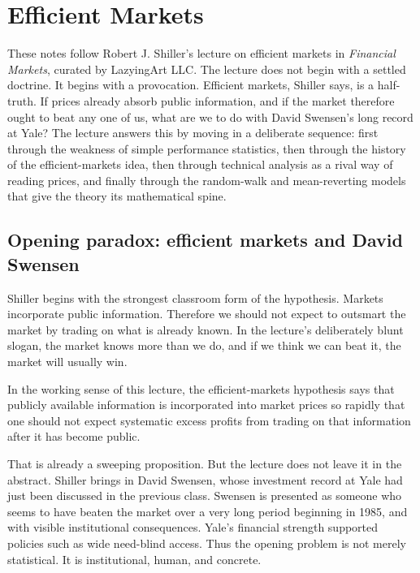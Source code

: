 \chapter{Efficient Markets}

These notes follow Robert J. Shiller's lecture on efficient markets in \emph{Financial Markets}, curated by LazyingArt LLC. The lecture does not begin with a settled doctrine. It begins with a provocation. Efficient markets, Shiller says, is a half-truth. If prices already absorb public information, and if the market therefore ought to beat any one of us, what are we to do with David Swensen's long record at Yale? The lecture answers this by moving in a deliberate sequence: first through the weakness of simple performance statistics, then through the history of the efficient-markets idea, then through technical analysis as a rival way of reading prices, and finally through the random-walk and mean-reverting models that give the theory its mathematical spine.

\section{Opening paradox: efficient markets and David Swensen}

Shiller begins with the strongest classroom form of the hypothesis. Markets incorporate public information. Therefore we should not expect to outsmart the market by trading on what is already known. In the lecture's deliberately blunt slogan, the market knows more than we do, and if we think we can beat it, the market will usually win.

\begin{definition}
In the working sense of this lecture, the efficient-markets hypothesis says that publicly available information is incorporated into market prices so rapidly that one should not expect systematic excess profits from trading on that information after it has become public.
\end{definition}

That is already a sweeping proposition. But the lecture does not leave it in the abstract. Shiller brings in David Swensen, whose investment record at Yale had just been discussed in the previous class. Swensen is presented as someone who seems to have beaten the market over a very long period beginning in 1985, and with visible institutional consequences. Yale's financial strength supported policies such as wide need-blind access. Thus the opening problem is not merely statistical. It is institutional, human, and concrete.

